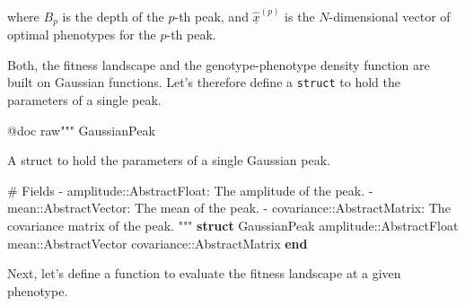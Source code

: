 \documentclass[
]{scrartcl}
\newenvironment{Shaded}{\begin{snugshade}}{\end{snugshade}}
\newcommand{\DataTypeTok}[1]{\textcolor[rgb]{0.68,0.00,0.00}{#1}}
\newcommand{\KeywordTok}[1]{\textcolor[rgb]{0.00,0.23,0.31}{\textbf{#1}}}
\newcommand{\NormalTok}[1]{\textcolor[rgb]{0.00,0.23,0.31}{#1}}
\newcommand{\OperatorTok}[1]{\textcolor[rgb]{0.37,0.37,0.37}{#1}}
\newcommand{\PreprocessorTok}[1]{\textcolor[rgb]{0.68,0.00,0.00}{#1}}
\newcommand{\StringTok}[1]{\textcolor[rgb]{0.13,0.47,0.30}{#1}}
\begin{document}
where \(B_p\) is the depth of the \(p\)-th peak, and
\(\underline{\hat{x}}^{(p)}\) is the \(N\)-dimensional vector of optimal
phenotypes for the \(p\)-th peak.

Both, the fitness landscape and the genotype-phenotype density function
are built on Gaussian functions. Let's therefore define a
\texttt{struct} to hold the parameters of a single peak.

\begin{Shaded}
\begin{Highlighting}[]
\PreprocessorTok{@doc} \StringTok{raw"""}
\StringTok{    GaussianPeak}

\StringTok{A struct to hold the parameters of a single Gaussian peak.}

\StringTok{\# Fields}
\StringTok{{-} \textasciigrave{}amplitude::AbstractFloat\textasciigrave{}: The amplitude of the peak.}
\StringTok{{-} \textasciigrave{}mean::AbstractVector\textasciigrave{}: The mean of the peak.}
\StringTok{{-} \textasciigrave{}covariance::AbstractMatrix\textasciigrave{}: The covariance matrix of the peak.}
\StringTok{"""}
\KeywordTok{struct}\NormalTok{ GaussianPeak}
\NormalTok{    amplitude}\OperatorTok{::}\DataTypeTok{AbstractFloat}
\NormalTok{    mean}\OperatorTok{::}\DataTypeTok{AbstractVector}
\NormalTok{    covariance}\OperatorTok{::}\DataTypeTok{AbstractMatrix}
\KeywordTok{end}
\end{Highlighting}
\end{Shaded}

Next, let's define a function to evaluate the fitness landscape at a
given phenotype.
\end{document}
